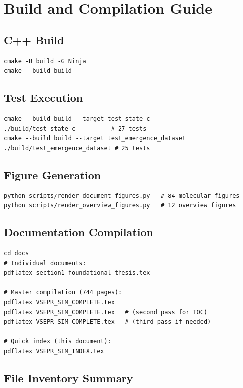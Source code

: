 \documentclass[11pt, letterpaper]{article}
\begin{document}
\section{Build and Compilation Guide}

\subsection{C++ Build}
\begin{verbatim}
cmake -B build -G Ninja
cmake --build build
\end{verbatim}

\subsection{Test Execution}
\begin{verbatim}
cmake --build build --target test_state_c
./build/test_state_c          # 27 tests
cmake --build build --target test_emergence_dataset
./build/test_emergence_dataset # 25 tests
\end{verbatim}

\subsection{Figure Generation}
\begin{verbatim}
python scripts/render_document_figures.py   # 84 molecular figures
python scripts/render_overview_figures.py   # 12 overview figures
\end{verbatim}

\subsection{Documentation Compilation}
\begin{verbatim}
cd docs
# Individual documents:
pdflatex section1_foundational_thesis.tex

# Master compilation (744 pages):
pdflatex VSEPR_SIM_COMPLETE.tex
pdflatex VSEPR_SIM_COMPLETE.tex   # (second pass for TOC)
pdflatex VSEPR_SIM_COMPLETE.tex   # (third pass if needed)

# Quick index (this document):
pdflatex VSEPR_SIM_INDEX.tex
\end{verbatim}

\subsection{File Inventory Summary}
\end{document}
